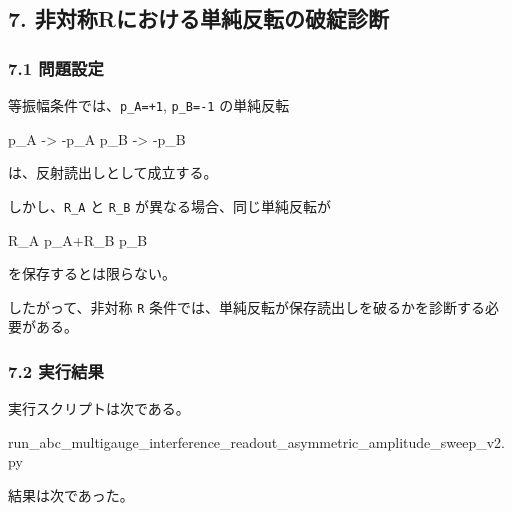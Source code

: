 \documentclass[
  a4paper,
]{article}
\newenvironment{Shaded}{}{}
\newcommand{\NormalTok}[1]{#1}
\begin{document}
\subsection{7.
非対称Rにおける単純反転の破綻診断}\label{ux975eux5bfeux79f0rux306bux304aux3051ux308bux5358ux7d14ux53cdux8ee2ux306eux7834ux7dbbux8a3aux65ad}

\subsubsection{7.1 問題設定}\label{ux554fux984cux8a2dux5b9a}

等振幅条件では、\texttt{p\_A=+1}, \texttt{p\_B=-1} の単純反転

\begin{Shaded}
\begin{Highlighting}[]
\NormalTok{p\_A {-}\textgreater{} {-}p\_A}
\NormalTok{p\_B {-}\textgreater{} {-}p\_B}
\end{Highlighting}
\end{Shaded}

は、反射読出しとして成立する。

しかし、\texttt{R\_A} と \texttt{R\_B} が異なる場合、同じ単純反転が

\begin{Shaded}
\begin{Highlighting}[]
\NormalTok{R\_A p\_A+R\_B p\_B}
\end{Highlighting}
\end{Shaded}

を保存するとは限らない。

したがって、非対称 \texttt{R}
条件では、単純反転が保存読出しを破るかを診断する必要がある。

\subsubsection{7.2 実行結果}\label{ux5b9fux884cux7d50ux679c}

実行スクリプトは次である。

\begin{Shaded}
\begin{Highlighting}[]
\NormalTok{run\_abc\_multigauge\_interference\_readout\_asymmetric\_amplitude\_sweep\_v2.py}
\end{Highlighting}
\end{Shaded}

結果は次であった。
\end{document}
